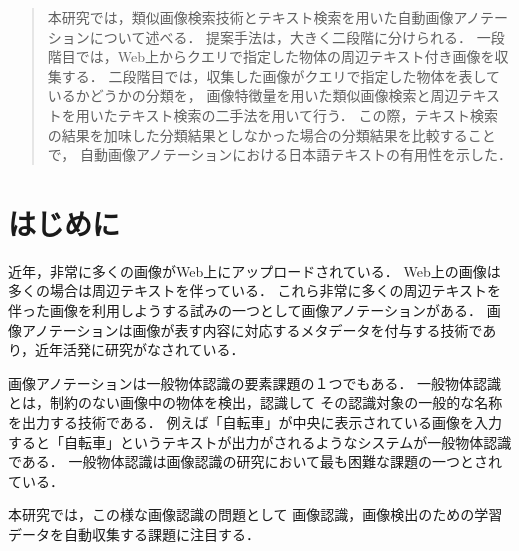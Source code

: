 
\begin{abstract}
本研究では，類似画像検索技術とテキスト検索を用いた自動画像アノテーションについて述べる．
提案手法は，大きく二段階に分けられる．
一段階目では，Web上からクエリで指定した物体の周辺テキスト付き画像を収集する．
二段階目では，収集した画像がクエリで指定した物体を表しているかどうかの分類を，
画像特徴量を用いた類似画像検索と周辺テキストを用いたテキスト検索の二手法を用いて行う．
この際，テキスト検索の結果を加味した分類結果としなかった場合の分類結果を比較することで，
自動画像アノテーションにおける日本語テキストの有用性を示した．
\end{abstract}



\chapter{はじめに}



近年，非常に多くの画像がWeb上にアップロードされている．
Web上の画像は多くの場合は周辺テキストを伴っている．
これら非常に多くの周辺テキストを伴った画像を利用しようする試みの一つとして画像アノテーションがある．
画像アノテーションは画像が表す内容に対応するメタデータを付与する技術であり，近年活発に研究がなされている\cite{jeon,watanabe}．

画像アノテーションは一般物体認識の要素課題の１つでもある．
一般物体認識とは，制約のない画像中の物体を検出，認識して
その認識対象の一般的な名称を出力する技術である．
例えば「自転車」が中央に表示されている画像を入力すると「自転車」というテキストが出力がされるようなシステムが一般物体認識である．
一般物体認識は画像認識の研究において最も困難な課題の一つとされている．\cite{yanai}

%
本研究では，この様な画像認識の問題として
画像認識，画像検出のための学習データを自動収集する課題に注目する．

